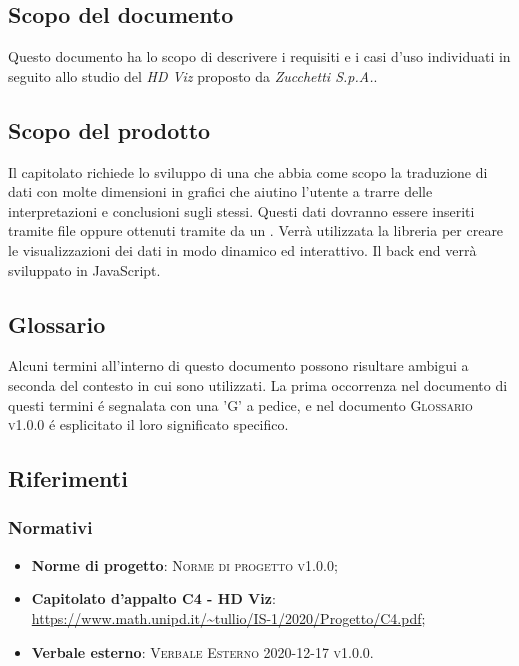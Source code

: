\documentclass[../analisi-dei-requisiti.tex]{subfiles}
\begin{document}
\subsection{Scopo del documento}%
\label{subs:scopo_del_documento}
Questo documento ha lo scopo di descrivere i requisiti e i casi d'uso individuati in seguito allo studio del  \emph{HD Viz} proposto da \emph{Zucchetti S.p.A.}. 

\subsection{Scopo del prodotto}%
\label{subs:scopo_del_prodotto}
Il capitolato richiede lo sviluppo di una  che abbia come scopo la 
traduzione di dati con molte dimensioni in grafici che aiutino l’utente a trarre delle interpretazioni e conclusioni sugli stessi. 
Questi dati dovranno essere inseriti tramite file  oppure ottenuti tramite  da un .
Verrà utilizzata la libreria   per creare le visualizzazioni dei dati in modo dinamico ed interattivo.
Il back end verrà sviluppato in JavaScript. 


\subsection{Glossario}
\label{subs:glossario}
Alcuni termini all'interno di questo documento possono risultare ambigui a seconda del contesto in cui sono utilizzati.
La prima occorrenza nel documento di questi termini é segnalata con una 'G' a pedice, e nel documento 
\textsc{Glossario v1.0.0} é esplicitato il loro significato specifico.


\subsection{Riferimenti}
\label{subs:riferimenti}

\subsubsection{Normativi}%
\label{sssec:normativi}

\begin{itemize}
  \item \textbf{Norme di progetto}: \textsc{Norme di progetto v1.0.0};
  \item \textbf{Capitolato d'appalto C4 - HD Viz}: \url{https://www.math.unipd.it/~tullio/IS-1/2020/Progetto/C4.pdf};
  \item \textbf{Verbale esterno}: \textsc{Verbale Esterno 2020-12-17 v1.0.0}.
\end{itemize}
\end{document}
